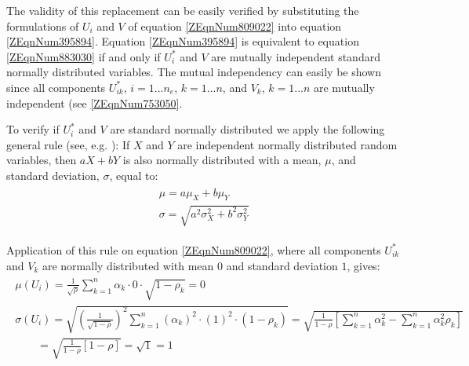 {The validity of this replacement can be easily verified by substituting the formulations of $U_i$ and $V$ of equation \eqref{ZEqnNum809022} into equation \eqref{ZEqnNum395894}.
Equation \eqref{ZEqnNum395894} is equivalent to equation \eqref{ZEqnNum883030} if and only if $U_i^{*}$ and $V$ are mutually independent standard normally distributed variables.
The mutual independency can easily be shown since all components $U_{ik}^{*}$, $i=1...n_e$, $k=1...n$, and  $V_k$, $k=1...n$ are mutually independent (see \eqref{ZEqnNum753050}. 

To verify if $U_i^{*}$ and $V$ are standard normally distributed we apply the following general rule (see, e.g. \cite{GrimmettStirzaker1983}): If $X$ and $Y$ are independent normally distributed random variables, then $aX+bY$ is also normally distributed with a mean, $\mu$, and standard deviation, $\sigma$, equal to:
\begin{align}
\begin{array}{l} {\mu =a\mu _{X} +b\mu _{Y} } \\ {\sigma =\sqrt{a^{2} \sigma _{X}^{2} +b^{2} \sigma _{Y}^{2} } } \end{array}\label{0.155)} 
\end{align}

Application of this rule on equation \eqref{ZEqnNum809022}, where all components $U_{ik}^{*}$ and  $V_k$ are normally distributed with mean $0$ and standard deviation $1$, gives:
\begin{align}
\begin{array}{l} {\mu \left(U_{i} \right)=\frac{1}{\sqrt{\rho } } \sum _{k=1}^{n}\alpha _{k} \cdot 0\cdot \sqrt{1-\rho _{k} }  =0} \\ {\sigma \left(U_{i} \right)=\sqrt{\left(\frac{1}{\sqrt{1-\rho } } \right)^{2} \sum _{k=1}^{n}\left(\alpha _{k} \right)^{2} \cdot \left(1\right)^{2} \cdot \left(1-\rho _{k} \right) } =\sqrt{\frac{1}{1-\rho } \left[\sum _{k=1}^{n}\alpha _{k}^{2}  -\sum _{k=1}^{n}\alpha _{k}^{2} \rho _{k}  \right]} } \\ {\quad \quad   =\sqrt{\frac{1}{1-\rho } \left[1-\rho \right]} =\sqrt{1} =1} \end{array}\label{0.156)} 
\end{align}

}
